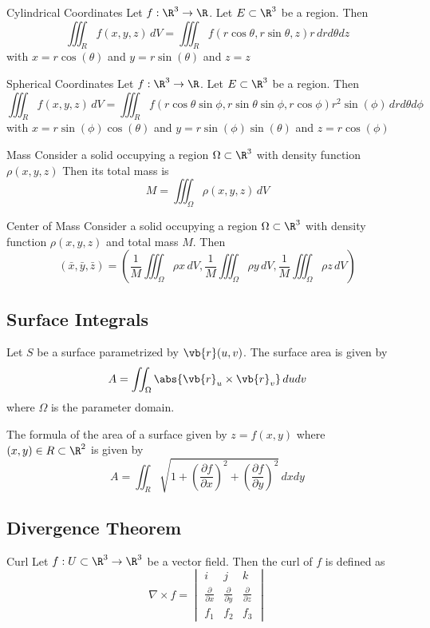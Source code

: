 \documentclass[a4paper]{article}
\begin{document}
\begin{thm}{Cylindrical Coordinates}{} Let $f:\R^3\to\R$. Let $E\subset\R^3$ be a region. Then $$\iiint_R f(x,y,z)\,dV=\iiint_R f(r\cos\theta,r\sin\theta,z)r\,drd\theta dz$$ with $x=r\cos(\theta)$ and $y=r\sin(\theta)$ and $z=z$
\end{thm}

\begin{thm}{Spherical Coordinates}{} Let $f:\R^3\to\R$. Let $E\subset\R^3$ be a region. Then $$\iiint_R f(x,y,z)\,dV=\iiint_R f(r\cos\theta\sin\phi,r\sin\theta\sin\phi,r\cos\phi)r^2\sin(\phi)\,drd\theta d\phi$$ with $x=r\sin(\phi)\cos(\theta)$ and $y=r\sin(\phi)\sin(\theta)$ and $z=r\cos(\phi)$
\end{thm}

\begin{thm}{Mass}{} Consider a solid occupying a region $\Omega\subset\R^3$ with density function $\rho(x,y,z)$ Then its total mass is $$M=\iiint_\Omega\rho(x,y,z)\,dV$$
\end{thm}

\begin{thm}{Center of Mass}{} Consider a solid occupying a region $\Omega\subset\R^3$ with density function $\rho(x,y,z)$ and total mass $M$. Then $$(\bar{x},\bar{y},\bar{z})=\left(\frac{1}{M}\iiint_\Omega\rho x\,dV, \frac{1}{M}\iiint_\Omega\rho y\,dV, \frac{1}{M}\iiint_\Omega\rho z\,dV\right)$$
\end{thm}

\subsection{Surface Integrals}
\begin{thm}{}{} Let $S$ be a surface parametrized by $\vb{r}(u,v)$. The surface area is given by $$A=\iint_{\Omega}\abs{\vb{r}_u\times\vb{r}_v}\,dudv$$ where $\Omega$ is the parameter domain. 
\end{thm}

\begin{lmm}{}{} The formula of the area of a surface given by $z=f(x,y)$ where $(x,y)\in R\subset\R^2$ is given by $$A=\iint_{R}\sqrt{1+\left(\frac{\partial f}{\partial x}\right)^2+\left(\frac{\partial f}{\partial y}\right)^2}\,dxdy$$
\end{lmm}

\subsection{Divergence Theorem}
\begin{defn}{Curl}{} Let $f:U\subset\R^3\to\R^3$ be a vector field. Then the curl of $f$ is defined as $$\nabla\times f=\begin{vmatrix}
i&j&k\\
\frac{\partial}{\partial x}&\frac{\partial}{\partial y}&\frac{\partial}{\partial z}\\
f_1&f_2&f_3
\end{vmatrix}$$
\end{defn}
\end{document}
